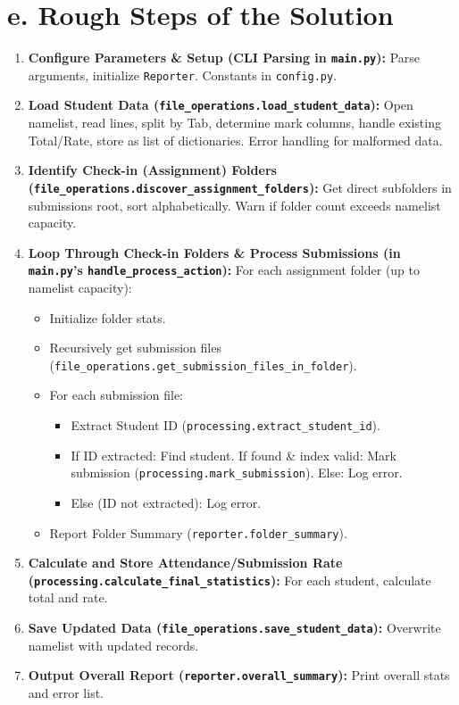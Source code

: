 \documentclass[11pt, a4paper]{article}
\begin{document}
\section*{e. Rough Steps of the Solution}
\begin{enumerate}[leftmargin=*]
    \item \textbf{Configure Parameters \& Setup (CLI Parsing in \texttt{main.py}):} Parse arguments, initialize \texttt{Reporter}. Constants in \texttt{config.py}.
    \item \textbf{Load Student Data (\texttt{file\_operations.load\_student\_data}):} Open namelist, read lines, split by Tab, determine mark columns, handle existing Total/Rate, store as list of dictionaries. Error handling for malformed data.
    \item \textbf{Identify Check-in (Assignment) Folders (\texttt{file\_operations.discover\_assignment\_folders}):} Get direct subfolders in submissions root, sort alphabetically. Warn if folder count exceeds namelist capacity.
    \item \textbf{Loop Through Check-in Folders \& Process Submissions (in \texttt{main.py}'s \texttt{handle\_process\_action}):}
    For each assignment folder (up to namelist capacity):
    \begin{itemize}
        \item Initialize folder stats.
        \item Recursively get submission files (\texttt{file\_operations.get\_submission\_files\_in\_folder}).
        \item For each submission file:
        \begin{itemize}
            \item Extract Student ID (\texttt{processing.extract\_student\_id}).
            \item If ID extracted: Find student. If found \& index valid: Mark submission (\texttt{processing.mark\_submission}). Else: Log error.
            \item Else (ID not extracted): Log error.
        \end{itemize}
        \item Report Folder Summary (\texttt{reporter.folder\_summary}).
    \end{itemize}
    \item \textbf{Calculate and Store Attendance/Submission Rate (\texttt{processing.calculate\_final\_statistics}):} For each student, calculate total and rate.
    \item \textbf{Save Updated Data (\texttt{file\_operations.save\_student\_data}):} Overwrite namelist with updated records.
    \item \textbf{Output Overall Report (\texttt{reporter.overall\_summary}):} Print overall stats and error list.
\end{enumerate}
\newpage
\end{document}
